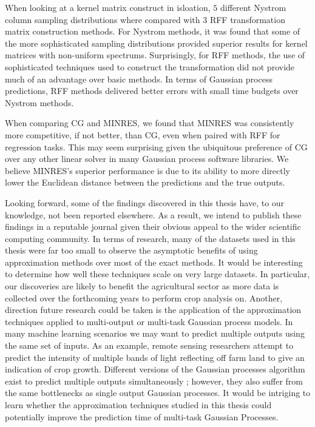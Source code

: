 When looking at a kernel matrix construct in isloation, $5$ different Nystrom column sampling distributions where compared with $3$ RFF transformation matrix construction methods. For Nystrom methods, it was found that some of the more sophisticated sampling distributions provided superior results for kernel matrices with non-uniform spectrums. Surprisingly, for RFF methods, the use of sophisticated techniques used to construct the transformation did not provide much of an advantage over basic methods. In terms of Gaussian process predictions, RFF methods delivered better errors with small time budgets over Nystrom methods.

When comparing CG and MINRES, we found that MINRES was consistently more competitive, if not better, than CG, even when paired with RFF for regression tasks. This may seem surprising given the ubiquitous preference of CG over any other linear solver in many Gaussian process software libraries. We believe MINRES's superior performance is due to its ability to more directly lower the Euclidean distance between the predictions and the true outputs.

Looking forward, some of the findings discovered in this thesis have, to our knowledge, not been reported elsewhere. As a result, we intend to publish these findings in a reputable journal given their obvious appeal to the wider scientific computing community. In terms of research, many of the datasets used in this thesis were far too small to observe the asymptotic benefits of using approximation methods over most of the exact methods. It would be interesting to determine how well these techniques scale on very large datasets. In particular, our discoveries are likely to benefit the agricultural sector as more data is collected over the forthcoming years to perform crop analysis on. Another, direction future research could be taken is the application of the approximation techniques applied to multi-output or multi-task Gaussian process models. In many machine learning scenarios we may want to predict multiple outputs using the same set of inputs. As an example, remote sensing researchers attempt to predict the intensity of multiple bands of light reflecting off farm land to give an indication of crop growth. Different versions of the Gaussian processes algorithm exist to predict multiple outputs simultaneously \cite{NIPS2007_66368270}; however, they also suffer from the same bottlenecks as single output Gaussian processes. It would be intriging to learn whether the approximation techniques studied in this thesis could potentially improve the prediction time of multi-task Gaussian Processes.
